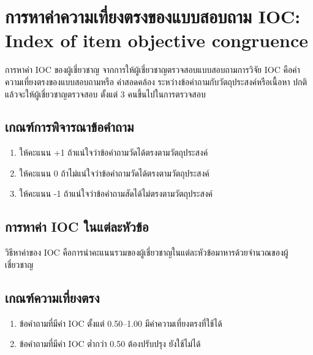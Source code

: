 \renewcommand\thechoice{\Alph{choice}}
\newcommand\choicelabel{\thechoice.}

\newenvironment{choices}%
  {\list{\choicelabel}%
     {\usecounter{choice}\def\makelabel##1{\hss\llap{##1}}%
       \settowidth{\leftmargin}{W.\hskip\labelsep\hskip 2.5em}%
       \def\choice{%
         \item
       } %
       \labelwidth\leftmargin\advance\labelwidth-\labelsep
       \topsep=0pt
       \partopsep=0pt
     }%
  }%
  {\endlist}

\chapter{การหาค่าความเที่ยงตรงของแบบสอบถาม IOC: Index of item objective congruence}

การหาค่า IOC ของผู้เชี่ยวชาญ จากการให้ผู้เชี่ยวชาญตรวจสอบแบบสอบถามการวิจัย IOC คือค่าความเที่ยงตรงของแบบสอบถามหรือ ค่าสอดคล้อง
ระหว่างข้อคำถามกับวัตถุประสงค์หรือเนื้อหา ปกติแล้วจะให้ผู้เชี่ยวชาญตรวจสอบ ตั้งแต่ 3 คนขึ้นไปในการตรวจสอบ

\section{เกณฑ์การพิจารณาข้อคำถาม}
\begin{enumerate}
    \item ให้คะแนน +1 ถ้าแน่ใจว่าข้อคำถามวัดได้ตรงตามวัตถุประสงค์
    \item ให้คะแนน 0 ถ้าไม่แน่ใจว่าข้อคำถามวัดได้ตรงตามวัตถุประสงค์
    \item ให้คะแนน -1 ถ้าแน่ใจว่าข้อคำถามสัดได้ไม่ตรงตามวัตถุประสงค์
\end{enumerate}

\section{การหาค่า IOC ในแต่ละหัวข้อ}
วิธีหาค่าของ IOC คือการนำคะแนนรวมของผู้เชี่ยวชาญในแต่ละหัวข้อมาหารด้วยจำนวณของผู้เชี่ยวชาญ

\section{เกณฑ์ความเที่ยงตรง}
\begin{enumerate}
    \item ข้อคำถามที่มีค่า IOC ตั้งแต่ 0.50--1.00 มีค่าความเที่ยงตรงที่ใช้ได้
    \item ข้อคำถามที่มีค่า IOC ต่ำกว่า 0.50 ต้องปรับปรุง ยังใช้ไม่ได้
\end{enumerate}

